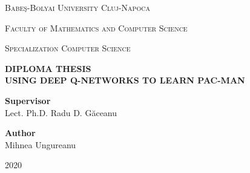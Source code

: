 \documentclass[12pt,twoside]{report}
\newcommand\blankpage{%
    \null
    \thispagestyle{empty}%
    \addtocounter{page}{-1}%
    \newpage}
\begin{document}
\begin{titlepage}
    \center %

    {\scshape\LARGE Babeş-Bolyai University Cluj-Napoca \par}
    \vspace{0.125cm}
    {\scshape\LARGE Faculty of Mathematics and Computer Science\par}
    \vspace{0.125cm}
    {\scshape\LARGE Specialization Computer Science\par}
    \vspace{5cm}

    {
        \bfseries
        \LARGE \uppercase{Diploma Thesis} \\[1.5cm]
        \LARGE \uppercase{Using Deep Q-networks to learn Pac-Man}
    }\\[4cm]

    \begin{flushleft}
        \Large
            \textbf{Supervisor}
            \vspace{0.2cm}\\
        \Large
            Lect. Ph.D. Radu D. Găceanu
            \vspace{0.125cm}\\
    \end{flushleft}

    \begin{flushright}
        \Large
            \textbf{Author}
            \vspace{0.2cm}\\
        \Large
            Mihnea Ungureanu
    \end{flushright}

    \vfill

    {\center \large 2020}
\end{titlepage}

\blankpage
\end{document}
